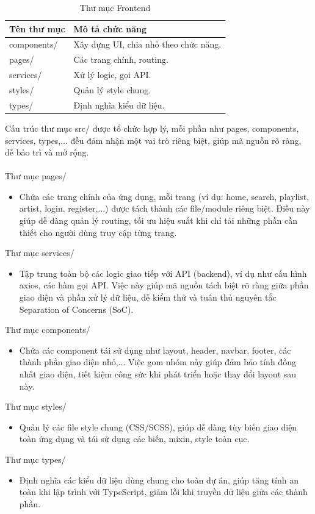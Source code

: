 \documentclass[a4paper]{article}
\begin{document}
\begin{table}[h]
    \centering
    \begin{tabular}{|l|l|} \hline 
         Tên thư mục& Mô tả chức năng\\ \hline
         components/& Xây dựng UI, chia nhỏ theo chức năng.\\ \hline 
         pages/& Các trang chính, routing.\\ \hline 
         services/& Xử lý logic, gọi API.\\ \hline
         styles/&Quản lý style chung.\\\hline
         types/&Định nghĩa kiểu dữ liệu.\\\hline
    \end{tabular}
    \caption{Thư mục Frontend}
    \label{tab:my_label}
\end{table}

Cấu trúc thư mục src/ được tổ chức hợp lý, mỗi phần như pages, components, services, types,... đều đảm nhận một vai trò riêng biệt, giúp mã nguồn rõ ràng, dễ bảo trì và mở rộng.\\
\\
Thư mục pages/\\
\begin{itemize}
    \item Chứa các trang chính của ứng dụng, mỗi trang (ví dụ: home, search, playlist, artist, login, register,...) được tách thành các file/module riêng biệt. Điều này giúp dễ dàng quản lý routing, tối ưu hiệu suất khi chỉ tải những phần cần thiết cho người dùng truy cập từng trang.
\end{itemize}
Thư mục services/\\
\begin{itemize}
    \item Tập trung toàn bộ các logic giao tiếp với API (backend), ví dụ như cấu hình axios, các hàm gọi API. Việc này giúp mã nguồn tách biệt rõ ràng giữa phần giao diện và phần xử lý dữ liệu, dễ kiểm thử và tuân thủ nguyên tắc Separation of Concerns (SoC).
\end{itemize}
Thư mục components/
\begin{itemize}
    \item Chứa các component tái sử dụng như layout, header, navbar, footer, các thành phần giao diện nhỏ,... Việc gom nhóm này giúp đảm bảo tính đồng nhất giao diện, tiết kiệm công sức khi phát triển hoặc thay đổi layout sau này.
\end{itemize}
Thư mục styles/
\begin{itemize}
    \item Quản lý các file style chung (CSS/SCSS), giúp dễ dàng tùy biến giao diện toàn ứng dụng và tái sử dụng các biến, mixin, style toàn cục.
\end{itemize}
Thư mục types/
\begin{itemize}
    \item Định nghĩa các kiểu dữ liệu dùng chung cho toàn dự án, giúp tăng tính an toàn khi lập trình với TypeScript, giảm lỗi khi truyền dữ liệu giữa các thành phần.
\end{itemize}
\end{document}
